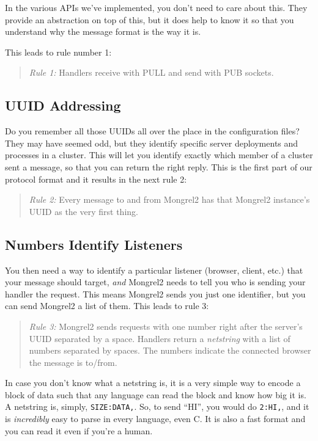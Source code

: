 In the various APIs we've implemented, you don't need to care about this.
They provide an abstraction on top of this, but it does help to know it
so that you understand why the message format is the way it is.

This leads to rule number 1:

\begin{quote}
\emph{Rule 1:} Handlers receive with PULL and send with PUB sockets.
\end{quote}

\subsection{UUID Addressing}

Do you remember all those UUIDs all over the place in the configuration files?
They may have seemed odd, but they identify specific server deployments and
processes in a cluster.  This will let you identify exactly which member of a
cluster sent a message, so that you can return the right reply.  This is the
first part of our protocol format and it results in the next rule 2:

\begin{quote}
\emph{Rule 2:} Every message to and from Mongrel2 has that Mongrel2 instance's
UUID as the very first thing.
\end{quote}

\subsection{Numbers Identify Listeners}

You then need a way to identify a particular listener (browser, client, etc.)
that your message should target, \emph{and} Mongrel2 needs to tell you who is
sending your handler the request.  This means Mongrel2 sends you just one
identifier, but you can send Mongrel2 a list of them.  This leads to rule 3:

\begin{quote}
\emph{Rule 3:} Mongrel2 sends requests with one number right after the server's
UUID separated by a space.  Handlers return a \emph{netstring} with a list of
numbers separated by spaces.  The numbers indicate the connected browser the
message is to/from.
\end{quote}

In case you don't know what a netstring is, it is a very simple way to encode a
block of data such that any language can read the block and know how big it is.
A netstring is, simply, \verb|SIZE:DATA,|. So, to send ``HI'', you would do
\verb|2:HI,|, and it is \emph{incredibly} easy to parse in every language, even
C\@.  It is also a fast format and you can read it even if you're a human.


